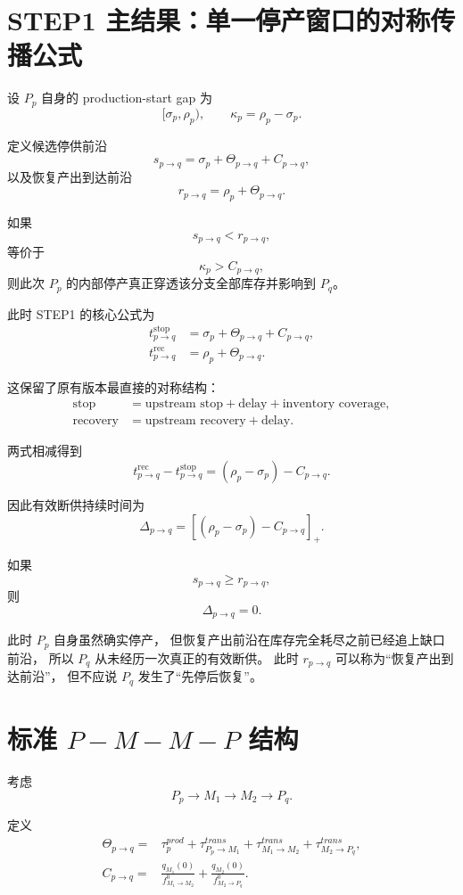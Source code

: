 \documentclass[UTF8,11pt]{ctexart}
\begin{document}
\section{STEP1 主结果：单一停产窗口的对称传播公式}

设 \(P_p\) 自身的 production-start gap 为
\[
[\sigma_p,\rho_p),
\qquad
\kappa_p=\rho_p-\sigma_p.
\]

定义候选停供前沿
\[
\boxed{
s_{p\to q}
=
\sigma_p+\Theta_{p\to q}+C_{p\to q},
}
\tag{3}
\]
以及恢复产出到达前沿
\[
\boxed{
r_{p\to q}
=
\rho_p+\Theta_{p\to q}.
}
\tag{4}
\]

如果
\[
s_{p\to q}<r_{p\to q},
\]
等价于
\[
\boxed{
\kappa_p>C_{p\to q},
}
\tag{5}
\]
则此次 \(P_p\) 的内部停产真正穿透该分支全部库存并影响到 \(P_q\)。

此时 STEP1 的核心公式为
\[
\boxed{
\begin{aligned}
t_{p\to q}^{\mathrm{stop}}
&=
\sigma_p
+\Theta_{p\to q}
+C_{p\to q},
\\[1mm]
t_{p\to q}^{\mathrm{rec}}
&=
\rho_p
+\Theta_{p\to q}.
\end{aligned}
}
\tag{6}
\]

这保留了原有版本最直接的对称结构：
\[
\boxed{
\begin{aligned}
\text{stop}
&=
\text{upstream stop}
+\text{delay}
+\text{inventory coverage},
\\
\text{recovery}
&=
\text{upstream recovery}
+\text{delay}.
\end{aligned}
}
\tag{7}
\]

两式相减得到
\[
\boxed{
t_{p\to q}^{\mathrm{rec}}
-
t_{p\to q}^{\mathrm{stop}}
=
(\rho_p-\sigma_p)-C_{p\to q}.
}
\tag{8}
\]

因此有效断供持续时间为
\[
\boxed{
\Delta_{p\to q}
=
\left[
(\rho_p-\sigma_p)-C_{p\to q}
\right]_+.
}
\tag{9}
\]

如果
\[
s_{p\to q}\ge r_{p\to q},
\]
则
\[
\boxed{
\Delta_{p\to q}=0.
}
\tag{10}
\]

此时 \(P_p\) 自身虽然确实停产，
但恢复产出前沿在库存完全耗尽之前已经追上缺口前沿，
所以 \(P_q\) 从未经历一次真正的有效断供。
此时 \(r_{p\to q}\) 可以称为“恢复产出到达前沿”，
但不应说 \(P_q\) 发生了“先停后恢复”。

\section{标准 \(P-M-M-P\) 结构}

考虑
\[
P_p\rightarrow M_1\rightarrow M_2\rightarrow P_q.
\]

定义
\[
\boxed{
\begin{aligned}
\Theta_{p\to q}
={}&
\tau_p^{prod}
+\tau_{P_p\to M_1}^{trans}
+\tau_{M_1\to M_2}^{trans}
+\tau_{M_2\to P_q}^{trans},
\\[1mm]
C_{p\to q}
={}&
\frac{q_{M_1}(0)}
     {f_{M_1\to M_2}^{0}}
+
\frac{q_{M_2}(0)}
     {f_{M_2\to P_q}^{0}}.
\end{aligned}
}
\tag{11}
\]
\end{document}
